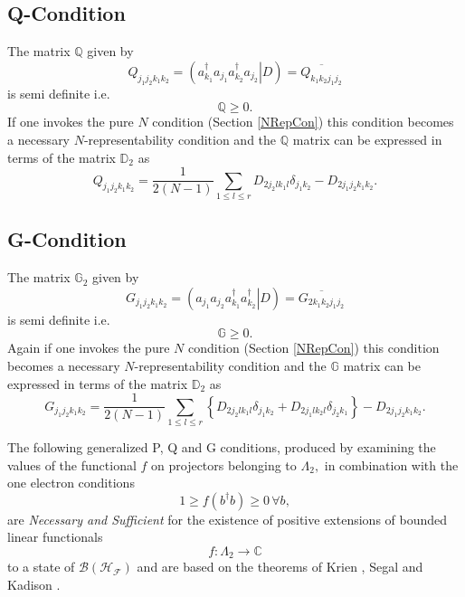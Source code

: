 \documentclass[aps,preprint]{revtex4}%
\begin{document}
\subsection{Q-Condition}

The matrix $\mathbb{Q}$ given by
\begin{equation}
Q_{j_{1}j_{2}k_{1}k_{2}}=\left(  \left.  a_{k_{1}}^{\dagger}a_{j_{1}}a_{k_{2}%
}^{\dagger}a_{j_{2}}\right\vert D\right)  =\overline{Q_{k_{1}k_{2}j_{1}j_{2}}}%
\end{equation}
is semi definite i.e.
\begin{equation}
\mathbb{Q}\geq0.
\end{equation}
If one invokes the pure $N$ condition (Section \ref{NRepCon}) this condition
becomes a necessary $N$-representability condition and the $\mathbb{Q}$ matrix
can be expressed in terms of the matrix $\mathbb{D}_{2}$ as
\begin{equation}
Q_{j_{1}j_{2}k_{1}k_{2}}=\frac{1}{2\left(  N-1\right)  }\sum_{1\leq l\leq
r}D_{2j_{2}lk_{1}l}\delta_{j_{1}k_{2}}-D_{2j_{1}j_{2}k_{1}k_{2}}.
\end{equation}


\subsection{G-Condition}

The matrix $\mathbb{G}_{2}$ given by
\begin{equation}
G_{j_{1}j_{2}k_{1}k_{2}}=\left(  \left.  a_{j_{1}}a_{j_{2}}a_{k_{1}}^{\dagger
}a_{k_{2}}^{\dagger}\right\vert D\right)  =\overline{G_{2k_{1}k_{2}j_{1}j_{2}%
}}%
\end{equation}
is semi definite i.e.
\begin{equation}
\mathbb{G}\geq0.
\end{equation}
Again if one invokes the pure $N$ condition (Section \ref{NRepCon}) this
condition becomes a necessary $N$-representability condition and the
$\mathbb{G}$ matrix can be expressed in terms of the matrix $\mathbb{D}_{2}$
as
\begin{equation}
G_{j_{1}j_{2}k_{1}k_{2}}=\frac{1}{2\left(  N-1\right)  }\sum_{1\leq l\leq
r}\left\{  D_{2j_{2}lk_{1}l}\delta_{j_{1}k_{2}}+D_{2j_{1}lk_{2}l}\delta
_{j_{2}k_{1}}\right\}  -D_{2j_{1}j_{2}k_{1}k_{2}}.
\end{equation}


The following generalized P, Q and G conditions, produced by examining the
values of the functional $f$ on projectors belonging to $\Lambda_{2},$ in
combination with the one electron conditions
\begin{equation}
1\geq f\left(  b^{\dagger}b\right)  \geq0\,\forall b,
\end{equation}
are \emph{Necessary and Sufficient }for the existence of positive extensions
of bounded linear functionals
\begin{equation}
f:\Lambda_{2}\rightarrow\mathbb{C}%
\end{equation}
to a state of $\mathcal{B}\left(  \mathcal{H}_{\mathcal{F}}\right)  $ and are
based on the theorems of Krien \cite{Krein}, Segal \cite{Segal} and Kadison
\cite{Kadison}.
\end{document}
